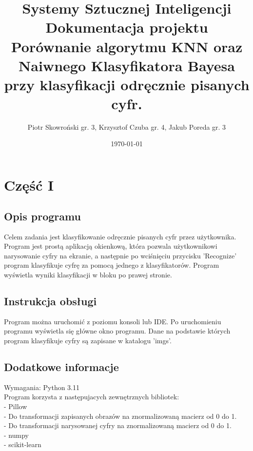 \documentclass[12pt,a4paper]{article}
\begin{document}
	\title{Systemy Sztucznej Inteligencji\\\small
    {Dokumentacja projektu\\Porównanie algorytmu KNN oraz 
        Naiwnego Klasyfikatora Bayesa przy klasyfikacji odręcznie pisanych cyfr.}}
    \author{Piotr Skowroński gr. 3, Krzysztof Czuba gr. 4, Jakub Poreda gr. 3}
	\date{\today}

	\maketitle
	\newpage
	\section*{Część I}
	\subsection*{Opis programu}
    Celem zadania jest klasyfikowanie odręcznie pisanych cyfr przez użytkownika. Program jest prostą aplikacją okienkową,
    która pozwala użytkownikowi narysowanie cyfry na ekranie, a następnie po wciśnięciu przycisku 'Recognize' program
    klasyfikuje cyfrę za pomocą jednego z klasyfikatorów. Program wyświetla wyniki klasyfikacji w bloku po prawej stronie.
	\subsection*{Instrukcja obsługi}
    Program można uruchomić z poziomu konsoli lub IDE. Po uruchomieniu programu wyświetla się główne okno programu.
    Dane na podstawie których program klasyfikuje cyfry są zapisane w katalogu 'imgs'.
	\subsection*{Dodatkowe informacje}
    Wymagania:
    Python 3.11\\
    Program korzysta z następujacych zewnętrznych bibliotek:\\
    - Pillow\\
       \indent - Do transformacji zapisanych obrazów na znormalizowaną macierz od 0 do 1.\\
       \indent - Do transformacji narysowanej cyfry na znormalizowaną macierz od 0 do 1.\\
    - numpy\\
    - scikit-learn %
	\newpage
\end{document}

